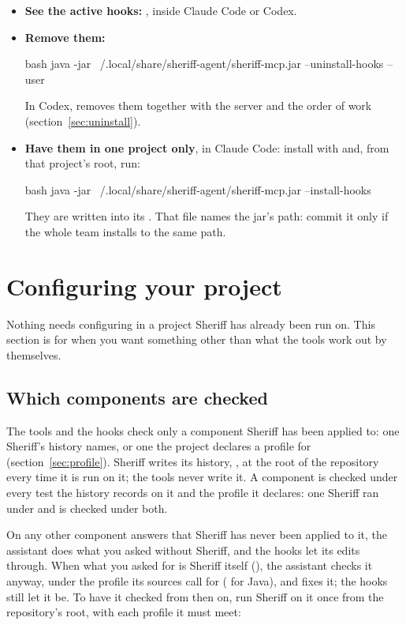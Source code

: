 \documentclass[11pt,a4paper]{article}
\begin{document}
\begin{itemize}
  \item \textbf{See the active hooks:} , inside Claude Code or
        Codex.
  \item \textbf{Remove them:}
\begin{command}{bash}
java -jar ~/.local/share/sheriff-agent/sheriff-mcp.jar --uninstall-hooks --user
\end{command}
        In Codex,  removes them together with the server
        and the order of work (section~\ref{sec:uninstall}).
  \item \textbf{Have them in one project only}, in Claude Code: install with 
        and, from that project's root, run:
\begin{command}{bash}
java -jar ~/.local/share/sheriff-agent/sheriff-mcp.jar --install-hooks
\end{command}
        They are written into its . That file names
        the jar's path: commit it only if the whole team installs to the same
        path.
\end{itemize}

\section{Configuring your project}
\label{sec:configure}

Nothing needs configuring in a project Sheriff has already been run on. This
section is for when you want something other than what the tools work out by
themselves.

\subsection{Which components are checked}\label{sec:scope}

The tools and the hooks check only a component Sheriff has been applied to:
one Sheriff's history names, or one the project declares a profile for
(section~\ref{sec:profile}). Sheriff writes its history,
, at the root of the repository every time it is run
on it; the tools never write it. A component is checked under every test the
history records on it and the profile it declares: one Sheriff ran under
 and  is checked under both.

On any other component  answers that Sheriff has never been
applied to it, the assistant does what you asked without Sheriff, and the hooks
let its edits through. When what you asked for is Sheriff itself
(), the assistant checks it anyway, under the
profile its sources call for ( for Java), and fixes it; the hooks
still let it be. To have it checked from then on, run Sheriff on it once from
the repository's root, with each profile it must meet:
\end{document}
